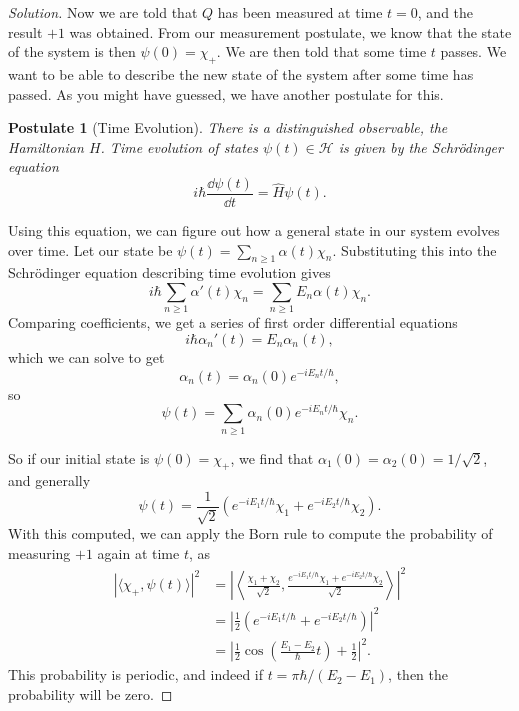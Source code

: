 \documentclass[a4paper]{scrartcl}
\newtheorem*{postulate}{Postulate}
\begin{document}
\begin{proof}[Solution]
    Now we are told that $Q$ has been measured at time $t = 0$, and the result $+1$ was obtained. From our measurement postulate, we know that the state of the system is then $\psi(0) = \chi_+$. We are then told that some time $t$ passes.
    We want to be able to describe the new state of the system after some time has passed. As you might have guessed, we have another postulate for this.

    \begin{postulate}[Time Evolution]
        There is a distinguished observable, the Hamiltonian $H$. Time evolution of states $\psi(t) \in \mathcal{H}$ is given by the Schrödinger equation
        $$
        i \hbar \frac{\dd \psi(t)}{\dd t} = \hat{H} \psi(t).
        $$
    \end{postulate}

    Using this equation, we can figure out how a general state in our system evolves over time. Let our state be $\psi(t) = \sum_{n \geq 1} \alpha(t) \chi_n$. Substituting this into the Schrödinger equation describing time evolution gives
    $$
    i \hbar \sum_{n \geq 1}\alpha'(t)\chi_n = \sum_{n \geq 1} E_n \alpha(t) \chi_n.
    $$
    Comparing coefficients, we get a series of first order differential equations
    $$
    i \hbar \alpha_n'(t) = E_n \alpha_n(t),
    $$
    which we can solve to get
    $$
    \alpha_n(t) = \alpha_n(0) e^{-i E_n t/\hbar},
    $$
    so
    $$
    \psi(t) = \sum_{n \geq 1} \alpha_n(0) e^{-iE_n t/\hbar} \chi_n.
    $$

    So if our initial state is $\psi(0) = \chi_+$, we find that $\alpha_1(0) = \alpha_2(0) = 1/\sqrt{2}$, and generally
    $$
    \psi(t) = \frac{1}{\sqrt{2}}\left(e^{-iE_1 t/\hbar} \chi_1+e^{-iE_2 t/\hbar} \chi_2\right).
    $$
    With this computed, we can apply the Born rule to compute the probability of measuring $+1$ again at time $t$, as
    \begin{align*}
    |\langle \chi_+ , \psi(t) \rangle|^2 &= \left|\left\langle \frac{\chi_1 + \chi_2}{\sqrt{2}}, \frac{e^{-iE_1 t/\hbar} \chi_1+e^{-iE_2 t/\hbar} \chi_2}{\sqrt{2}}\right\rangle\right|^2 \\
    &= \left|\frac{1}{2}\left(e^{-iE_1 t/\hbar}+e^{-iE_2 t/\hbar} \right)\right|^2 \\
    &= \left|\frac{1}{2}\cos \left(\frac{E_{1}-E_{2}}{\hbar} t\right) + \frac{1}{2}\right|^2.
    \end{align*}
    This probability is periodic, and indeed if $t = \pi \hbar/(E_2 - E_1)$, then the probability will be zero.
\end{proof}
\end{document}

